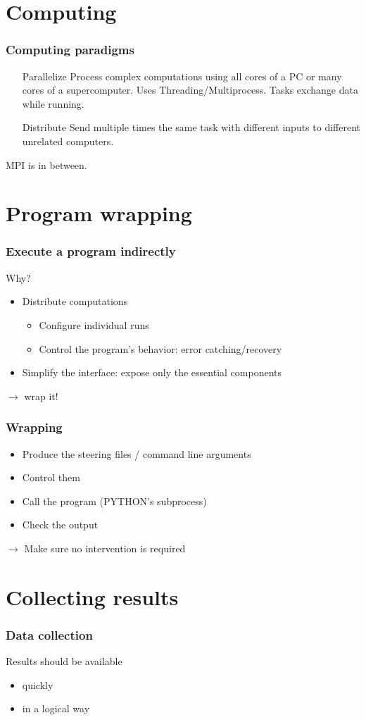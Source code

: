 \documentclass[14pt]{beamer}
\begin{document}
\section{Computing}
\begin{frame}
\frametitle{Computing paradigms}
\begin{itemize}
\item[Parallelize] Process complex computations using all cores of a PC or many cores of a supercomputer. Uses Threading/Multiprocess. Tasks exchange data while running.
\item[Distribute] Send multiple times the same task with different inputs to different unrelated computers.
\end{itemize}
MPI is in between.
\end{frame}

\section{Program wrapping}
\begin{frame}
\frametitle{Execute a program indirectly}
Why?
\begin{itemize}
\item Distribute computations
\begin{itemize}
\item Configure individual runs
\item Control the program's behavior: error catching/recovery
\end{itemize}
\item Simplify the interface: expose only the essential components
\end{itemize}
$\rightarrow$ wrap it!
\end{frame}

\begin{frame}
\frametitle{Wrapping}
\begin{itemize}
\item Produce the steering files / command line arguments
\item Control them
\item Call the program (PYTHON's subprocess)
\item Check the output
\end{itemize}
$\rightarrow$ Make sure no intervention is required
\end{frame}


\section{Collecting results}
\begin{frame}
\frametitle{Data collection}
Results should be available
\begin{itemize}
\item quickly
\item in a logical way
\end{itemize}
\end{frame}
\end{document}
